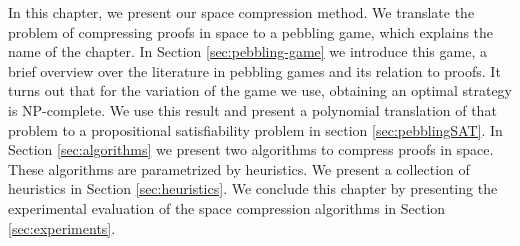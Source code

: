 
In this chapter, we present our space compression method.
We translate the problem of compressing proofs in space to a pebbling game, which explains the name of the chapter.
In Section \ref{sec:pebbling-game} we introduce this game, a brief overview over the literature in pebbling games and its relation to proofs.
It turns out that for the variation of the game we use, obtaining an optimal strategy is NP-complete.
We use this result and present a polynomial translation of that problem to a propositional satisfiability problem in section \ref{sec:pebblingSAT}.
In Section \ref{sec:algorithms} we present two algorithms to compress proofs in space.
These algorithms are parametrized by heuristics.
We present a collection of heuristics in Section \ref{sec:heuristics}.
We conclude this chapter by presenting the experimental evaluation of the space compression algorithms in Section \ref{sec:experiments}.


%


%


